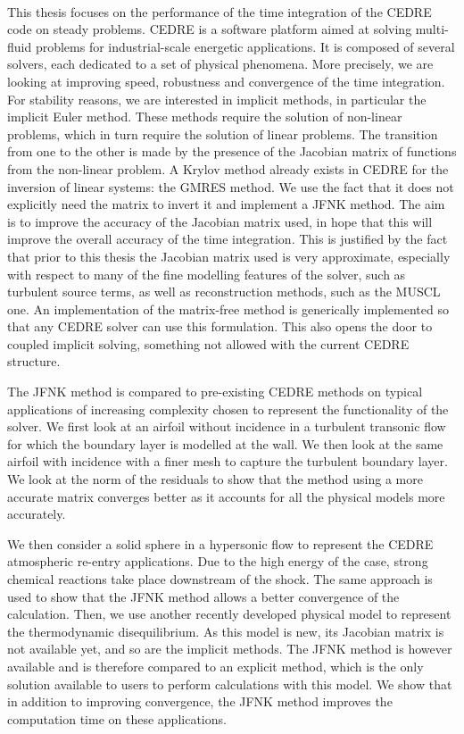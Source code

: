     \paragraph{}
This thesis focuses on the performance of the time integration of the CEDRE code on steady problems.
CEDRE is a software platform aimed at solving multi-fluid problems for industrial-scale energetic applications.
It is composed of several solvers, each dedicated to a set of physical phenomena.
More precisely, we are looking at improving speed, robustness and convergence of the time integration.
For stability reasons, we are interested in implicit methods, in particular the implicit Euler method.
These methods require the solution of non-linear problems, which in turn require the solution of linear problems.
The transition from one to the other is made by the presence of the Jacobian matrix of functions from the non-linear problem.
A Krylov method already exists in CEDRE for the inversion of linear systems: the GMRES method.
We use the fact that it does not explicitly need the matrix to invert it and implement a JFNK method.
The aim is to improve the accuracy of the Jacobian matrix used, in hope that this will improve the overall accuracy of the time integration.
This is justified by the fact that prior to this thesis the Jacobian matrix used is very approximate, especially with respect to many of the fine modelling features of the solver, such as turbulent source terms, as well as reconstruction methods, such as the MUSCL one.
An implementation of the matrix-free method is generically implemented so that any CEDRE solver can use this formulation.
This also opens the door to coupled implicit solving, something not allowed with the current CEDRE structure.

The JFNK method is compared to pre-existing CEDRE methods on typical applications of increasing complexity chosen to represent the functionality of the solver.
We first look at an airfoil without incidence in a turbulent transonic flow for which the boundary layer is modelled at the wall.
We then look at the same airfoil with incidence with a finer mesh to capture the turbulent boundary layer.
We look at the norm of the residuals to show that the method using a more accurate matrix converges better as it accounts for all the physical models more accurately.

We then consider a solid sphere in a hypersonic flow to represent the CEDRE atmospheric re-entry applications.
Due to the high energy of the case, strong chemical reactions take place downstream of the shock.
The same approach is used to show that the JFNK method allows a better convergence of the calculation.
Then, we use another recently developed physical model to represent the thermodynamic disequilibrium.
As this model is new, its Jacobian matrix is not available yet, and so are the implicit methods.
The JFNK method is however available and is therefore compared to an explicit method, which is the only solution available to users to perform calculations with this model.
We show that in addition to improving convergence, the JFNK method improves the computation time on these applications.

